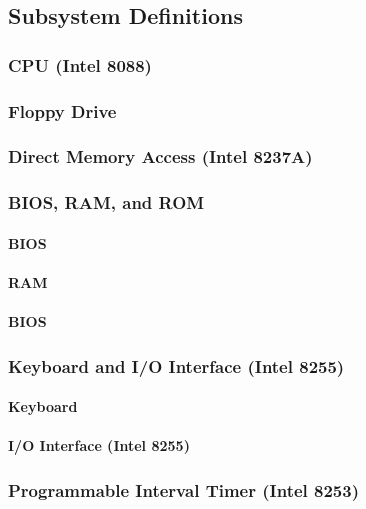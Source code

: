 \documentclass[12pt, letterpaper]{article}
\begin{document}
\subsection{Subsystem Definitions}

\subsubsection{CPU (Intel 8088)}

\subsubsection{Floppy Drive}

\subsubsection{Direct Memory Access (Intel 8237A)}

\subsubsection{BIOS, RAM, and ROM}

\paragraph{BIOS}

\paragraph{RAM}

\paragraph{BIOS}

\subsubsection{Keyboard and I/O Interface (Intel 8255)}

\paragraph{Keyboard}

\paragraph{I/O Interface (Intel 8255)}

\subsubsection{Programmable Interval Timer (Intel 8253)}
\end{document}
